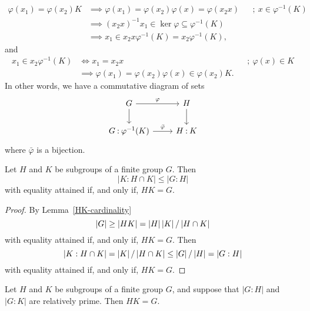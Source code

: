 \begin{rem}
\begin{enumerate}[-]
        \begin{align*}
            \varphi(x_1)=\varphi(x_2)K &\implies \varphi(x_1)=\varphi(x_2)\varphi(x)
                    =\varphi(x_2x)
                    &&;\ x\in\varphi^{-1}(K)\\
                &\implies (x_2x)^{-1}x_1\in\ker\varphi\subseteq\varphi^{-1}(K)\\
                &\implies x_1\in x_2x\varphi^{-1}(K)=x_2\varphi^{-1}(K),
        \end{align*}
        and
        \begin{align*}
            x_1\in x_2\varphi^{-1}(K)
                &\iff x_1=x_2x&&;\ \varphi(x)\in K\\
                &\implies \varphi(x_1)=\varphi(x_2)\varphi(x)\in\varphi(x_2)K. 
        \end{align*}
        In other words, we have a commutative diagram of sets
        \begin{equation}\label{diag:isomorphic-coclasses}
            \begin{tikzcd}
                G
                        \arrow[r,"\varphi"]
                        \arrow[d]
                    &H
                        \arrow[d]\\
                \lco G{\varphi^{-1}(K)}
                        \arrow[r,"\bar\varphi"]
                    &\lco HK
            \end{tikzcd}
        \end{equation}
        where $\bar\varphi$ is a bijection.
    \end{enumerate}
\end{rem}

\begin{cor}\label{index-inequality}
    Let $H$ and $K$ be subgroups of a finite group $G$. Then
    $$
        |K:H \cap K| \le |G:H|
    $$
    with equality attained if, and only if, $HK = G$.
\end{cor}

\begin{proof} By Lemma~\ref{HK-cardinality}
$$
    \left\vert{G}\right\vert\ge\left\vert{HK}\right\vert=\left\vert{H}\right\vert\left\vert{K}\right\vert/\left\vert{H\cap K}\right\vert
$$
with equality attained if, and only if, $HK=G$. Then
$$
    \left\vert{K:H\cap K}\right\vert = \left\vert{K}\right\vert/\left\vert{H\cap K}\right\vert \le \left\vert{G}\right\vert/\left\vert{H}\right\vert = \left\vert{G:H}\right\vert
$$
with equality attained if, and only if, $HK=G$.  \end{proof}

\begin{cor}\label{coprime-indexes}
    Let $H$ and $K$ be subgroups of a finite group $G$, and suppose that $|G:H|$ and $|G:K|$ are relatively prime. Then $HK = G$.
\end{cor}

